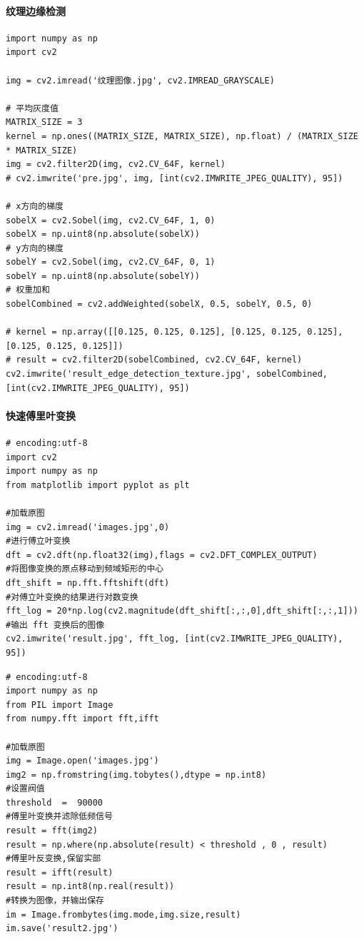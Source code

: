 \documentclass[11pt]{ctexart}
\begin{document}
\paragraph{纹理边缘检测}

\lstset{language=python}
\begin{lstlisting}
import numpy as np
import cv2

img = cv2.imread('纹理图像.jpg', cv2.IMREAD_GRAYSCALE)

# 平均灰度值
MATRIX_SIZE = 3
kernel = np.ones((MATRIX_SIZE, MATRIX_SIZE), np.float) / (MATRIX_SIZE * MATRIX_SIZE)
img = cv2.filter2D(img, cv2.CV_64F, kernel)
# cv2.imwrite('pre.jpg', img, [int(cv2.IMWRITE_JPEG_QUALITY), 95])

# x方向的梯度
sobelX = cv2.Sobel(img, cv2.CV_64F, 1, 0)
sobelX = np.uint8(np.absolute(sobelX))
# y方向的梯度
sobelY = cv2.Sobel(img, cv2.CV_64F, 0, 1)
sobelY = np.uint8(np.absolute(sobelY))
# 权重加和
sobelCombined = cv2.addWeighted(sobelX, 0.5, sobelY, 0.5, 0)

# kernel = np.array([[0.125, 0.125, 0.125], [0.125, 0.125, 0.125],[0.125, 0.125, 0.125]])
# result = cv2.filter2D(sobelCombined, cv2.CV_64F, kernel)
cv2.imwrite('result_edge_detection_texture.jpg', sobelCombined, [int(cv2.IMWRITE_JPEG_QUALITY), 95])
\end{lstlisting}

\paragraph{快速傅里叶变换}

\lstset{language=python}
\begin{lstlisting}
# encoding:utf-8
import cv2
import numpy as np
from matplotlib import pyplot as plt

#加载原图
img = cv2.imread('images.jpg',0)
#进行傅立叶变换
dft = cv2.dft(np.float32(img),flags = cv2.DFT_COMPLEX_OUTPUT)
#将图像变换的原点移动到频域矩形的中心
dft_shift = np.fft.fftshift(dft)
#对傅立叶变换的结果进行对数变换
fft_log = 20*np.log(cv2.magnitude(dft_shift[:,:,0],dft_shift[:,:,1]))
#输出 fft 变换后的图像
cv2.imwrite('result.jpg', fft_log, [int(cv2.IMWRITE_JPEG_QUALITY), 95])
\end{lstlisting}

\lstset{language=python}
\begin{lstlisting}
# encoding:utf-8
import numpy as np
from PIL import Image
from numpy.fft import fft,ifft

#加载原图
img = Image.open('images.jpg')
img2 = np.fromstring(img.tobytes(),dtype = np.int8)
#设置阀值
threshold  =  90000
#傅里叶变换并滤除低频信号
result = fft(img2)
result = np.where(np.absolute(result) < threshold , 0 , result)
#傅里叶反变换,保留实部
result = ifft(result)
result = np.int8(np.real(result))
#转换为图像，并输出保存
im = Image.frombytes(img.mode,img.size,result)
im.save('result2.jpg')
\end{lstlisting}
\end{document}

